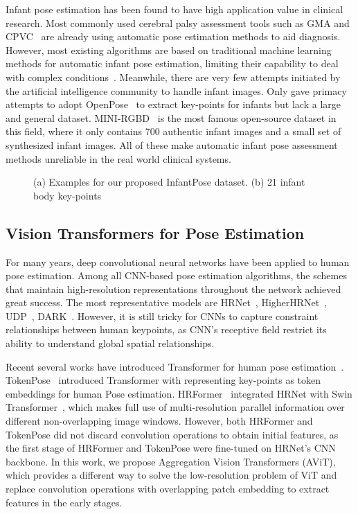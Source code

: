 \documentclass{article}
\begin{document}
Infant pose estimation has been found to have high application value in clinical research. Most commonly used cerebral palsy assessment tools such as GMA and CPVC~\cite{abbruzzese2020assessing} are already using automatic pose estimation methods to aid diagnosis. However, most existing algorithms are based on traditional machine learning methods for automatic infant pose estimation, limiting their capability to deal with complex conditions~\cite{silva2021future}. Meanwhile, there are very few attempts initiated by the artificial intelligence community to handle infant images. Only \cite{mccay2019establishing,reich2021novel} gave primacy attempts to adopt OpenPose~\cite{cao2019openpose} to extract key-points for infants but lack a large and general dataset. MINI-RGBD~\cite{hesse2018computer} is the most famous open-source dataset in this field, where it only contains 700 authentic infant images and a small set of synthesized infant images. All of these make automatic infant pose assessment methods unreliable in the real world clinical systems.

\begin{figure}[h]
\centering
{}
\caption{(a) Examples for our proposed InfantPose dataset. (b) 21 infant body key-points}
\label{fig:dataset_example}
\end{figure}

\subsection{Vision Transformers for Pose Estimation}
For many years, deep convolutional neural networks have been applied to human pose estimation. Among all CNN-based pose estimation algorithms, the schemes that maintain high-resolution representations throughout the network achieved great success. The most representative models are HRNet~\cite{wang2020deep}, HigherHRNet~\cite{cheng2020higherhrnet}, UDP~\cite{huang2020devil}, DARK~\cite{zhang2020distribution}. However, it is still tricky for CNNs to capture constraint relationships between human keypoints, as CNN's receptive field restrict its ability to understand global spatial relationships.

Recent several works have introduced Transformer for human pose estimation~\cite{yuan2021hrformer,yang2021transpose,li2021tokenpose}. TokenPose~\cite{li2021tokenpose} introduced Transformer with representing key-points as token embeddings for human Pose estimation. HRFormer~\cite{yuan2021hrformer} integrated HRNet with Swin Transformer~\cite{liu2021swin}, which makes full use of multi-resolution parallel information over different non-overlapping image windows. However, both HRFormer and TokenPose did not discard convolution operations to obtain initial features, as the first stage of HRFormer and TokenPose were fine-tuned on HRNet's CNN backbone. In this work, we propose Aggregation Vision Transformers (AViT), which provides a different way to solve the low-resolution problem of ViT and replace convolution operations with overlapping patch embedding to extract features in the early stages.
\end{document}
